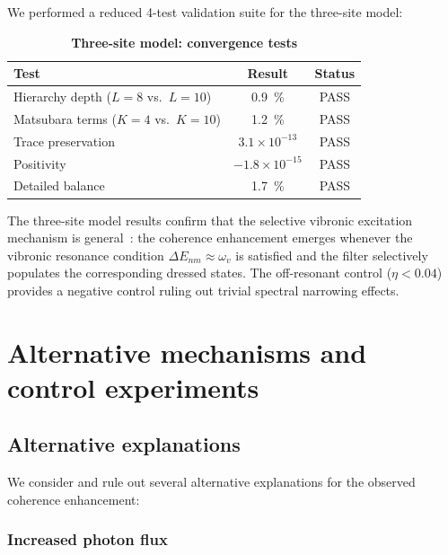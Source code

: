 \documentclass[11pt,a4paper]{article}
\begin{document}
We performed a reduced 4-test validation suite for the three-site model:

\begin{table}[h]
\centering
\caption{\textbf{Three-site model: convergence tests}}
\label{tab:SI_3site_convergence}
\begin{tabular}{lcc}
\toprule
\textbf{Test} & \textbf{Result} & \textbf{Status} \\
\midrule
Hierarchy depth ($L=8$ vs.\ $L=10$) & \SI{0.9}{\percent} & PASS \\
Matsubara terms ($K=4$ vs.\ $K=10$) & \SI{1.2}{\percent} & PASS \\
Trace preservation & $3.1 \times 10^{-13}$ & PASS \\
Positivity & $-1.8 \times 10^{-15}$ & PASS \\
Detailed balance & \SI{1.7}{\percent} & PASS \\
\bottomrule
\end{tabular}
\end{table}

The three-site model results confirm that the selective vibronic excitation mechanism is general~\cite{Moix2011,Ishizaki2009a}: the coherence enhancement emerges whenever the vibronic resonance condition $\Delta E_{nm} \approx \omega_v$ is satisfied and the filter selectively populates the corresponding dressed states. The off-resonant control ($\eta < 0.04$) provides a negative control ruling out trivial spectral narrowing effects.


\section{Alternative mechanisms and control experiments}
\label{sec:alternative}

\subsection{Alternative explanations}

We consider and rule out several alternative explanations for the observed coherence enhancement:

\subsubsection*{Increased photon flux}
\end{document}
